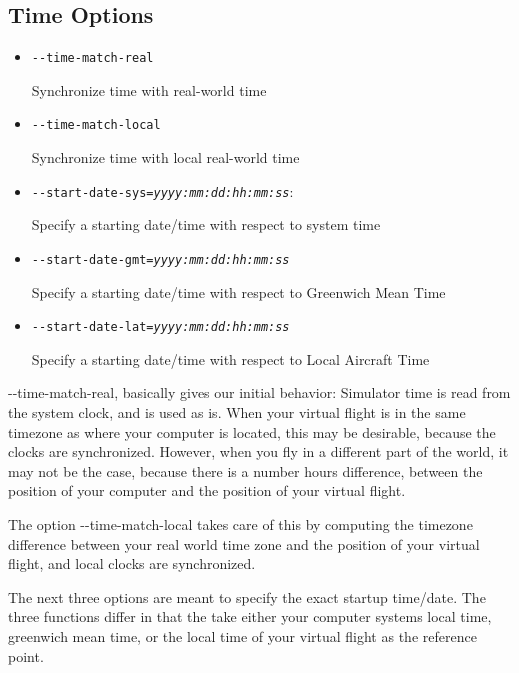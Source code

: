 \subsection{Time Options}
\begin{itemize}
\item{\texttt{-$ $-time-match-real}}

  Synchronize time with real-world time

\item{\texttt{-$ $-time-match-local}}

  Synchronize time with local real-world time

\item{\texttt{-$ $-start-date-sys={\it yyyy:mm:dd:hh:mm:ss}}}:

  Specify a starting date/time with respect to system time

\item{\texttt{-$ $-start-date-gmt={\it yyyy:mm:dd:hh:mm:ss}}}

  Specify a starting date/time with respect to Greenwich Mean Time

\item{\texttt{-$ $-start-date-lat={\it yyyy:mm:dd:hh:mm:ss}}}

  Specify a starting date/time with respect to Local Aircraft Time
\end{itemize}

{-$ $-time-match-real}, basically gives our initial behavior: Simulator time is 
read from the system clock, and is used as is. When your virtual flight is in 
the same timezone as where your computer is located, this may be desirable, 
because the clocks are synchronized. However, when you fly in a different 
part of the world, it may not be the case, because there is a number hours 
difference, between the position of your computer and the position of your 
virtual flight.

The option {-$ $-time-match-local} takes care of this by computing the timezone 
difference between your real world time zone and the position of your virtual 
flight, and local clocks are synchronized. 

The next three options are meant to specify the exact startup time/date. The 
three functions differ in that the take either your computer systems local 
time, greenwich mean time, or the local time of your virtual flight as the 
reference point. 

